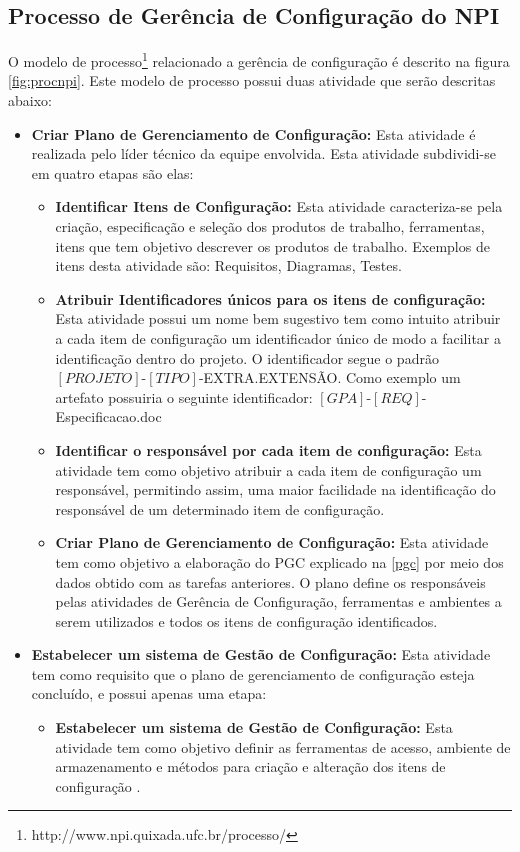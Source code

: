 \subsection{Processo de Gerência de Configuração do NPI}
O modelo de processo\footnote{http://www.npi.quixada.ufc.br/processo/} relacionado a gerência de configuração é descrito na figura \autoref{fig:procnpi}. Este modelo de processo possui duas atividade que serão descritas abaixo:
\begin{itemize}
\item \textbf{Criar Plano de Gerenciamento de Configuração:} Esta atividade é realizada pelo líder técnico da equipe envolvida. Esta atividade subdividi-se em quatro etapas são elas:
\begin{itemize}
\item \textbf{Identificar Itens de Configuração:} Esta atividade caracteriza-se pela criação, especificação e seleção dos produtos de trabalho, ferramentas, itens que tem objetivo descrever os produtos de trabalho. Exemplos de itens desta atividade são: Requisitos, Diagramas, Testes.

\item \textbf{Atribuir Identificadores únicos para os itens de configuração:} Esta atividade possui um nome bem sugestivo tem como intuito atribuir a cada item de configuração um identificador único de modo a facilitar a identificação dentro do projeto. O identificador segue o padrão $\left[PROJETO\right]$-$\left[TIPO\right]$-EXTRA.EXTENSÃO. Como exemplo um artefato possuiria o seguinte identificador: $\left[GPA\right]$-$\left[REQ\right]$-Especificacao.doc

\item \textbf{Identificar o responsável por cada item de configuração:} Esta atividade tem como objetivo atribuir a cada item de configuração um responsável, permitindo assim, uma maior facilidade na identificação do responsável de um determinado item de configuração.
\item \textbf{Criar	Plano de Gerenciamento de Configuração:} Esta atividade tem como objetivo a elaboração do PGC explicado na \autoref{pgc} por meio dos dados obtido com as tarefas anteriores. O plano define os responsáveis pelas atividades de Gerência de Configuração, ferramentas e ambientes a serem utilizados e todos os itens de configuração identificados.
\end{itemize}
\item \textbf{Estabelecer um sistema de Gestão de Configuração:} Esta atividade tem como requisito que o plano de gerenciamento de configuração esteja concluído, e possui apenas uma etapa:
\begin{itemize}
\item \textbf{Estabelecer um sistema de Gestão de Configuração:} Esta atividade tem como objetivo definir as ferramentas de acesso, ambiente de armazenamento e métodos para criação e alteração dos itens de configuração \cite{processonpi}. 
\end{itemize}
\end{itemize}

